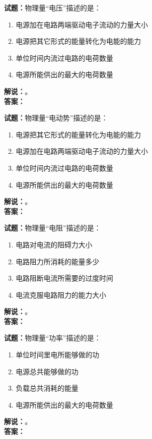 \documentclass{ctexbook}
\begin{document}
\bigskip

\noindent\textbf{试题：}物理量“电压”描述的是：
\begin{enumerate}[leftmargin=3em]
  \item 电源加在电路两端驱动电子流动的力量大小
  \item 电源把其它形式的能量转化为电能的能力
  \item 单位时间内流过电路的电荷数量
  \item 电源所能供出的最大的电荷数量
\end{enumerate}
\noindent\textbf{解说：}\textbf{}。\\\noindent\textbf{答案：}

\bigskip

\noindent\textbf{试题：}物理量“电动势”描述的是：
\begin{enumerate}[leftmargin=3em]
  \item 电源把其它形式的能量转化为电能的能力
  \item 电源加在电路两端驱动电子流动的力量大小
  \item 单位时间内流过电路的电荷数量
  \item 电源所能供出的最大的电荷数量
\end{enumerate}
\noindent\textbf{解说：}\textbf{}。\\\noindent\textbf{答案：}

\bigskip

\noindent\textbf{试题：}物理量“电阻”描述的是：
\begin{enumerate}[leftmargin=3em]
  \item 电路对电流的阻碍力大小
  \item 电路阻力所消耗的能量多少
  \item 电路阻断电流所需要的过度时间
  \item 电流克服电路阻力的能力大小
\end{enumerate}
\noindent\textbf{解说：}\textbf{}。\\\noindent\textbf{答案：}

\bigskip

\noindent\textbf{试题：}物理量“功率”描述的是：
\begin{enumerate}[leftmargin=3em]
  \item 单位时间里电所能够做的功
  \item 电源总共能够做的功
  \item 负载总共消耗的能量
  \item 电源所能供出的最大的电荷数量
\end{enumerate}
\noindent\textbf{解说：}\textbf{}。\\\noindent\textbf{答案：}
\end{document}
